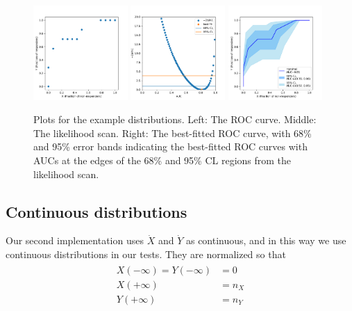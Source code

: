 \documentclass[11pt]{article}
\newcommand{\Xdot}{\dot{X}}
\newcommand{\Ydot}{\dot{Y}}
\begin{document}
\begin{figure}
	\begin{center}
		\includegraphics[width=0.32\textwidth]{discrete_exampleroc.pdf}
		\includegraphics[width=0.32\textwidth]{discrete_scan.pdf}
		\includegraphics[width=0.32\textwidth]{discrete_exampleroc_errors.pdf}
		\caption{Plots for the example distributions. Left: The ROC curve. Middle: The likelihood scan. Right: The best-fitted ROC curve, with 68\% and 95\% error bands indicating the best-fitted ROC curves with AUCs at the edges of the 68\% and 95\% CL regions from the likelihood scan.\label{fig:exampledata_discrete}}
	\end{center}
\end{figure}

\subsection{Continuous distributions}\label{sec:lagrangian}

Our second implementation uses \(\Xdot\) and \(\Ydot\) as continuous, and in this way we use continuous distributions in our tests.  They are normalized so that
\begin{align}
\begin{aligned}
X(-\infty)=Y(-\infty)&=0 \\
X(+\infty)&=n_X \\
Y(+\infty)&=n_Y
\end{aligned}
\end{align}
\end{document}

